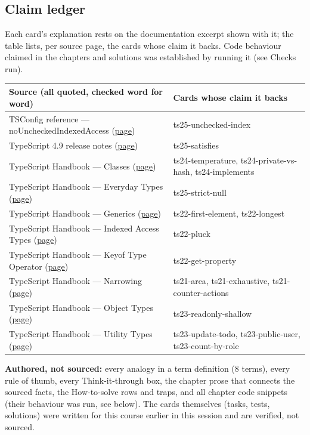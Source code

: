 \documentclass[10pt]{article}
\begin{document}
\subsection*{Claim ledger}
{\footnotesize Each card's explanation rests on the documentation excerpt shown with it; the table lists, per source page, the cards whose claim it backs. Code behaviour claimed in the chapters and solutions was established by running it (see Checks run).}
{\footnotesize\begin{tabularx}{\linewidth}{@{}p{2.2in}X@{}}\toprule
\textbf{Source (all quoted, checked word for word)} & \textbf{Cards whose claim it backs}\\\midrule
TSConfig reference — noUncheckedIndexedAccess (\href{https://www.typescriptlang.org/tsconfig/\#noUncheckedIndexedAccess}{page}) & ts25-unchecked-index\\
TypeScript 4.9 release notes (\href{https://www.typescriptlang.org/docs/handbook/release-notes/typescript-4-9.html}{page}) & ts25-satisfies\\
TypeScript Handbook — Classes (\href{https://www.typescriptlang.org/docs/handbook/2/classes.html}{page}) & ts24-temperature, ts24-private-vs-hash, ts24-implements\\
TypeScript Handbook — Everyday Types (\href{https://www.typescriptlang.org/docs/handbook/2/everyday-types.html}{page}) & ts25-strict-null\\
TypeScript Handbook — Generics (\href{https://www.typescriptlang.org/docs/handbook/2/generics.html}{page}) & ts22-first-element, ts22-longest\\
TypeScript Handbook — Indexed Access Types (\href{https://www.typescriptlang.org/docs/handbook/2/indexed-access-types.html}{page}) & ts22-pluck\\
TypeScript Handbook — Keyof Type Operator (\href{https://www.typescriptlang.org/docs/handbook/2/keyof-types.html}{page}) & ts22-get-property\\
TypeScript Handbook — Narrowing (\href{https://www.typescriptlang.org/docs/handbook/2/narrowing.html}{page}) & ts21-area, ts21-exhaustive, ts21-counter-actions\\
TypeScript Handbook — Object Types (\href{https://www.typescriptlang.org/docs/handbook/2/objects.html}{page}) & ts23-readonly-shallow\\
TypeScript Handbook — Utility Types (\href{https://www.typescriptlang.org/docs/handbook/utility-types.html}{page}) & ts23-update-todo, ts23-public-user, ts23-count-by-role\\
\bottomrule\end{tabularx}}
{\footnotesize\textbf{Authored, not sourced:} every analogy in a term definition (8 terms), every rule of thumb, every Think-it-through box, the chapter prose that connects the sourced facts, the How-to-solve rows and traps, and all chapter code snippets (their behaviour was run, see below). The cards themselves (tasks, tests, solutions) were written for this course earlier in this session and are verified, not sourced.}
\end{document}
